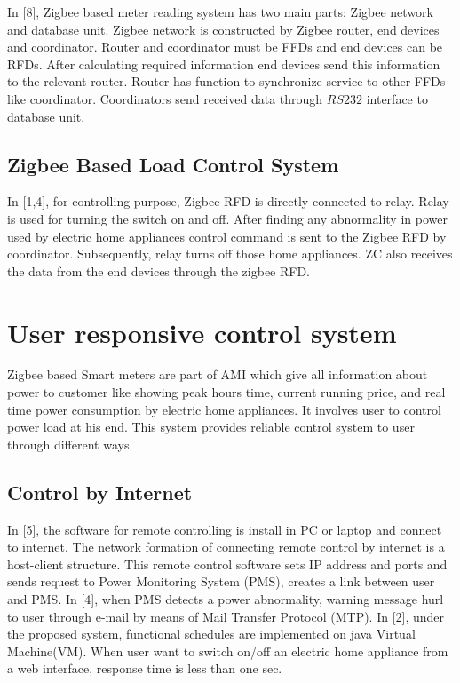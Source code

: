 \documentclass[10pt, conference, compsocconf]{IEEEtran}
\begin{document}
In [8], Zigbee based meter reading system has two main parts: Zigbee network and database unit. Zigbee network is constructed by Zigbee router, end devices and coordinator. Router and coordinator must be FFDs and end devices can be RFDs. After calculating required information end devices send this information to the relevant router. Router has function to synchronize service to other FFDs like coordinator. Coordinators send received data through $RS232$ interface to database unit.

\subsection{Zigbee Based Load Control System}

In [1,4], for controlling purpose, Zigbee RFD is directly connected to relay. Relay is used for turning the switch on and off. After finding any abnormality in power used by electric home appliances control command is sent to the Zigbee RFD by coordinator. Subsequently, relay turns off those home appliances. ZC also receives the data from the end devices through the zigbee RFD.

\section{User responsive control system}
Zigbee based Smart meters are part of AMI which give all information about power to customer like showing peak hours time, current running price, and real time power consumption by electric home appliances. It involves user to control power load at his end. This system provides reliable control system to user through different ways.

\subsection{Control by Internet}
In [5], the software for remote controlling is install in PC or laptop and connect to internet. The network formation of connecting remote control by internet is a host-client structure. This remote control software sets IP address and ports and sends request to Power Monitoring System (PMS), creates a link between user and PMS. In [4], when PMS detects a power abnormality, warning message hurl to user through e-mail by means of Mail Transfer Protocol (MTP). In [2], under the proposed system, functional schedules are implemented on java Virtual Machine(VM). When user want to switch on/off an electric home appliance from a web interface, response time is less than one sec.
\end{document}
